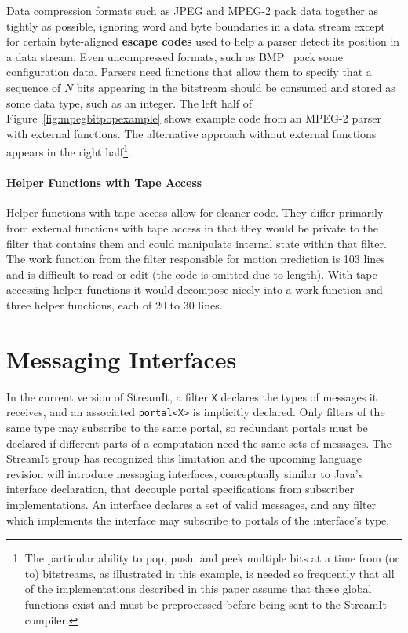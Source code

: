 Data compression formats such as JPEG and MPEG-2 pack data together as 
tightly as possible, ignoring word and byte boundaries in a data stream 
except for certain byte-aligned \textbf{escape codes} used to help a parser 
detect its position in a data stream. Even uncompressed formats, such as 
BMP~\cite{bmp} pack some configuration data. 
Parsers need functions that allow them to specify that a sequence of $N$ 
bits appearing in the bitstream should be consumed and stored as some data 
type, such as an integer. The left half of Figure~\ref{fig:mpegbitpopexample} 
shows example 
code from an MPEG-2 parser with external functions. The alternative approach 
without external functions appears in the right 
half\footnote{The particular ability to pop, 
push, and peek multiple bits at a time from (or to) bitstreams, as 
illustrated in this example, is needed so frequently that all of the 
implementations described in this paper assume that these global functions 
exist and must be preprocessed before being sent to the StreamIt compiler.}.

\paragraph{Helper Functions with Tape Access}
\label{sec:helperfunctionswithtapeaccess}
Helper functions with tape access allow for cleaner code. 
They differ primarily from external functions with tape access 
in that they would be private to the filter that contains them
and could manipulate internal state within that filter. 
The work function from the filter responsible for motion prediction
is 103 lines and is difficult to read or edit (the code is omitted due to length).
With tape-accessing helper functions it would decompose nicely into a work
function and three helper functions, each of 20 to 30 lines.

\section{Messaging Interfaces}
 
In the current version of StreamIt, a filter {\tt X} declares the types of messages 
it receives, and an associated {\tt portal<X>} is implicitly declared. Only filters 
of the same type may subscribe to the same portal, so redundant portals must be 
declared if different parts of a computation need the same sets of messages. The 
StreamIt group has recognized this limitation and the upcoming language revision 
will introduce messaging interfaces, conceptually similar to Java's interface 
declaration, that decouple portal specifications from subscriber implementations. 
An interface declares a set of valid messages, and any filter which implements the 
interface may subscribe to portals of the interface's type. 

